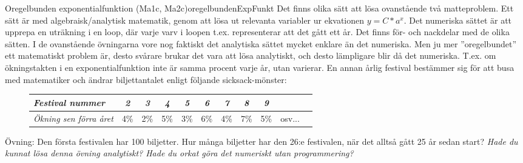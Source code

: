 \newpage
\begin{matteovningm}{Oregelbunden exponentialfunktion (Ma1c, Ma2c)}{oregelbundenExpFunkt}
Det finns olika sätt att lösa ovanstående två matteproblem. Ett sätt är med algebraisk/analytisk matematik, genom att lösa ut relevanta variabler ur ekvationen $y=C*a^x$. Det numeriska sättet är att upprepa en uträkning i en loop, där varje varv i loopen t.ex. representerar att det gått ett år.
\newline
\newline
Det finns för- och nackdelar med de olika sätten. I de ovanstående övningarna vore nog faktiskt det analytiska sättet mycket enklare än det numeriska. Men ju mer ''oregelbundet'' ett matematiskt problem är, desto svårare brukar det vara att lösa analytiskt, och desto lämpligare blir då det numeriska. T.ex. om ökningstakten i en exponentialfunktion inte är samma procent varje år, utan varierar.
\newline
\newline
En annan årlig festival bestämmer sig för att busa med matematiker och ändrar biljettantalet enligt följande sicksack-mönster:

\begin{figure}[H]
\begin{center}
\begin{tabular}{l|*{9}{c}r}
\emph{Festival nummer} & \emph{2} & \emph{3} & \emph{4} & \emph{5} & \emph{6} & \emph{7} & \emph{8} & \emph{9} & \\
\hline
\emph{Ökning sen förra året}       & 4\% & 2\% & 5\% & 3\% & 6\% & 4\% & 7\% & 5\% & osv...  \\
\end{tabular}
\end{center}
\end{figure}

Övning: Den första festivalen har 100 biljetter. Hur många biljetter har den 26:e festivalen, när det alltså gått 25 år sedan start?
\newline
\newline
\emph{Hade du kunnat lösa denna övning analytiskt? Hade du orkat göra det numeriskt utan programmering?}
\end{matteovningm}
\newpage
